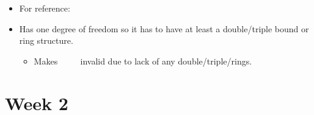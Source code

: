 \documentclass[12pt,a4paper]{article}
\begin{document}
\begin{enumerate}
\begin{itemize}
                \begin{itemize}
                    \item For reference: 
                    \hspace{8pt}
                    {\tiny{}
                    \hspace{12pt}
                    }
                    \item Has one degree of freedom so it has to have at least a double/triple bound or ring structure.
                        \begin{itemize}
                            \item Makes ~~{\tiny{}} ~~invalid due to lack of any double/triple/rings.
                        \end{itemize}
                \end{itemize}
        \end{itemize}
\end{enumerate}

\clearpage
\section*{Week 2}
{}
\end{document}
